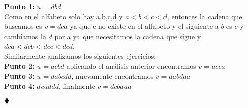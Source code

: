 \textbf{Punto 1:} $u=d b d$\\

Como en el alfabeto solo hay a,b,c,d y $a<b<c<d$, entonces la cadena que buscamos es $v=dca$ ya que e no existe en el alfabeto y el siguiente a $b$ es $c$ y cambiamos la $d$ por a ya que necesitamos la cadena que sigue y $dca<dcb<dcc<dcd$.\\

Similarmente analizamos los siguientes ejercicios:\\

\textbf{Punto 2:} $u=acbd$ aplicando el análisis anterior encontramos $v=acca$\\

\textbf{Punto 3:} $u=dabcdd$, nuevamente encontramos $v=dabdaa$\\

\textbf{Punto 4:} $dcaddd$, finalmente $v=dcbaaa$

$\hfill \blacklozenge$
